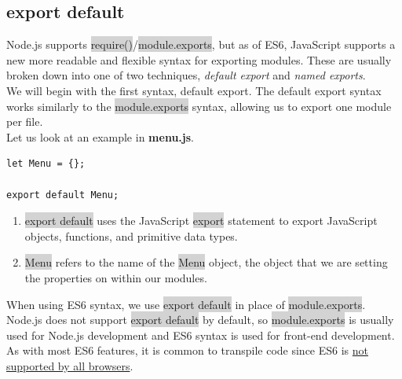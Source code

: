 \documentclass[11pt]{article}
\begin{document}
\subsection{export default}
Node.js supports \colorbox{lightgray}{require()}/\colorbox{lightgray}{module.exports}, but as of ES6, JavaScript supports a new more readable and flexible syntax for exporting modules. These are usually broken down into one of two techniques, \textit{default export} and \textit{named exports}. \\
\newline
We will begin with the first syntax, default export. The default export syntax works similarly to the \colorbox{lightgray}{module.exports} syntax, allowing us to export one module per file. \\
\newline
Let us look at an example in \textbf{menu.js}.
\begin{lstlisting}
let Menu = {};

export default Menu;
\end{lstlisting}
\begin{enumerate}[leftmargin = *]
\item \colorbox{lightgray}{export default} uses the JavaScript \colorbox{lightgray}{export} statement to export JavaScript objects, functions, and primitive data types.
\item \colorbox{lightgray}{Menu} refers to the name of the \colorbox{lightgray}{Menu} object, the object that we are setting the properties on within our modules.
\end{enumerate}
When using ES6 syntax, we use \colorbox{lightgray}{export default} in place of \colorbox{lightgray}{module.exports}. Node.js does not support \colorbox{lightgray}{export default} by default, so \colorbox{lightgray}{module.exports} is usually used for Node.js development and ES6 syntax is used for front-end development. As with most ES6 features, it is common to transpile code since ES6 is \href{https://caniuse.com/#search=sd}{not supported by all browsers}.
\end{document}
